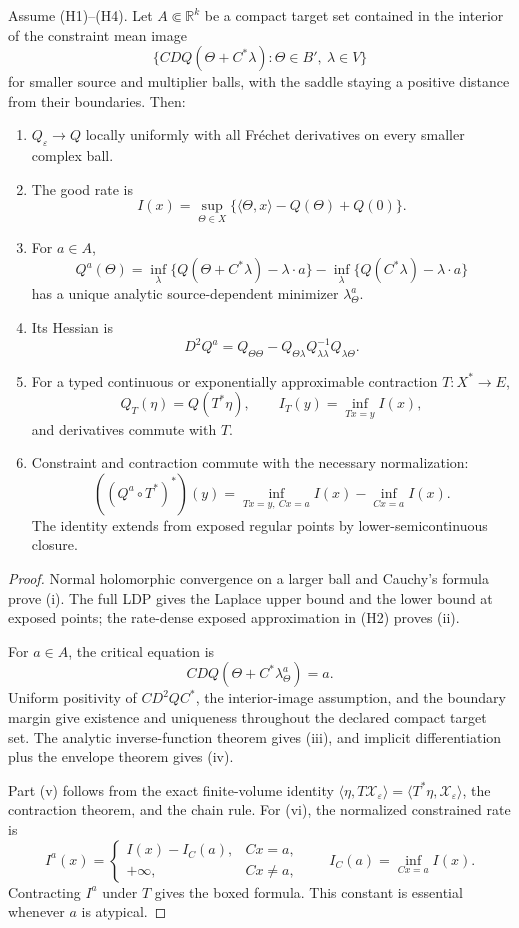 \begin{theorem}
\label{thm:r3-d1-commutation}
Assume (H1)--(H4).  Let \(A\Subset\mathbb R^k\) be a compact target set
contained in the interior of the constraint mean image
\[
 \{CDQ(\Theta+C^*\lambda):
 \Theta\in B',\ \lambda\in V\}
\]
for smaller source and multiplier balls, with the saddle staying a positive
distance from their boundaries.  Then:
\begin{enumerate}[label=(\roman*)]
\item \(Q_\varepsilon\to Q\) locally uniformly with all Fr\'echet
      derivatives on every smaller complex ball.
\item The good rate is
\[
 I(x)=\sup_{\Theta\in X}
 \{\langle\Theta,x\rangle-Q(\Theta)+Q(0)\}.
\]
\item For \(a\in A\),
\[
 Q^a(\Theta)
 =\inf_\lambda\{Q(\Theta+C^*\lambda)-\lambda\cdot a\}
 -\inf_\lambda\{Q(C^*\lambda)-\lambda\cdot a\}
\]
has a unique analytic source-dependent minimizer \(\lambda_\Theta^a\).
\item Its Hessian is
\[
 D^2Q^a
 =Q_{\Theta\Theta}
 -Q_{\Theta\lambda}Q_{\lambda\lambda}^{-1}
 Q_{\lambda\Theta}.
\]
\item For a typed continuous or exponentially approximable contraction
      \(T:X^*\to E\),
\[
 Q_T(\eta)=Q(T^*\eta),
 \qquad I_T(y)=\inf_{Tx=y}I(x),
\]
and derivatives commute with \(T\).
\item Constraint and contraction commute with the necessary normalization:
\[
 \boxed{
 ((Q^a\circ T^*)^*)(y)
 =\inf_{Tx=y,\ Cx=a}I(x)
 -\inf_{Cx=a}I(x).}
\]
The identity extends from exposed regular points by lower-semicontinuous
closure.
\end{enumerate}
\end{theorem}

\begin{proof}
Normal holomorphic convergence on a larger ball and Cauchy's formula prove
(i).  The full LDP gives the Laplace upper bound and the lower bound at exposed
points; the rate-dense exposed approximation in (H2) proves (ii).

For \(a\in A\), the critical equation is
\[
 CDQ(\Theta+C^*\lambda_\Theta^a)=a.
\]
Uniform positivity of \(CD^2QC^*\), the interior-image assumption, and the
boundary margin give existence and uniqueness throughout the declared compact
target set.  The analytic inverse-function theorem gives (iii), and
implicit differentiation plus the envelope theorem gives (iv).

Part (v) follows from the exact finite-volume identity
\(\langle\eta,T\mathcal X_\varepsilon\rangle
 =\langle T^*\eta,\mathcal X_\varepsilon\rangle\), the contraction theorem,
and the chain rule.  For (vi), the normalized constrained rate is
\[
 I^a(x)=
 \begin{cases}
 I(x)-I_C(a),&Cx=a,\\
 +\infty,&Cx\ne a,
 \end{cases}
 \qquad I_C(a)=\inf_{Cx=a}I(x).
\]
Contracting \(I^a\) under \(T\) gives the boxed formula.  This constant is
essential whenever \(a\) is atypical.
\end{proof}

